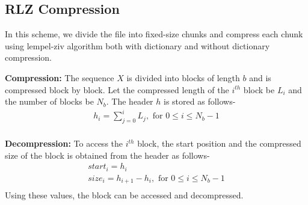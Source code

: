 \subsection{RLZ Compression}
In this scheme, we divide the file into fixed-size chunks and compress each chunk using lempel-ziv algorithm  both with  dictionary and without dictionary compression. 

\textbf{Compression:} The sequence $X$ is divided into blocks of length $b$ and is compressed block by block. Let the compressed length of the $i^{th}$ block be $L_i$ and the number of blocks be $N_b$. The header $h$ is stored as follows-
$$
\begin{gathered}
    h_i = \sum_{j=0}^{i} L_j, \text{ for } 0 \leq i \leq N_b - 1 \\
\end{gathered}
$$

\textbf{Decompression:} To access the $i^{th}$ block, the start position and the compressed size of the block is obtained from the header as follows-
$$
\begin{gathered}
    start_i = h_i \\
    size_i = h_{i+1} - h_i,  \text{ for } 0 \leq i \leq N_b - 1 \\
\end{gathered}
$$
Using these values, the block can be accessed and decompressed.

